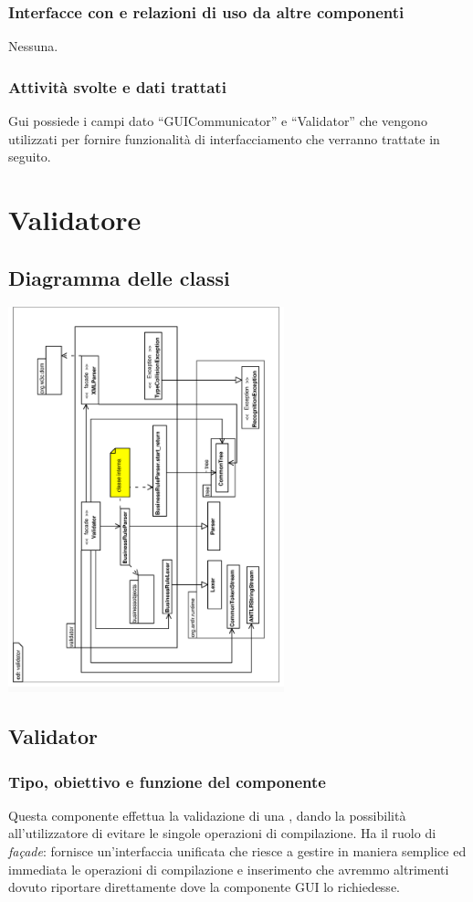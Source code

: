 \documentclass[11pt,titlepage,a4paper]{report}
\begin{document}
\subsubsection{Interfacce con e relazioni di uso da altre componenti}
Nessuna.
\subsubsection{Attivit\`a svolte e dati trattati}
Gui possiede i campi dato ``GUICommunicator'' e ``Validator'' che vengono utilizzati per fornire funzionalit\`a di interfacciamento che verranno trattate in seguito.

\section{Validatore}
\subsection{Diagramma delle classi}
\begin{center}
\includegraphics[width=0.6\textwidth, angle=-90]{DiagrammaClassi/validator.eps}
\end{center}
\subsection{Validator}%
\subsubsection{Tipo, obiettivo e funzione del componente}
Questa componente effettua la validazione di una \br, dando la possibilit\`a all'utilizzatore di evitare le singole operazioni di compilazione. Ha il ruolo di \textit{fa\c{c}ade}: fornisce un'interfaccia unificata che riesce a gestire in maniera semplice ed immediata le operazioni di compilazione e inserimento che avremmo altrimenti dovuto riportare direttamente dove la componente GUI lo richiedesse.
\end{document}
